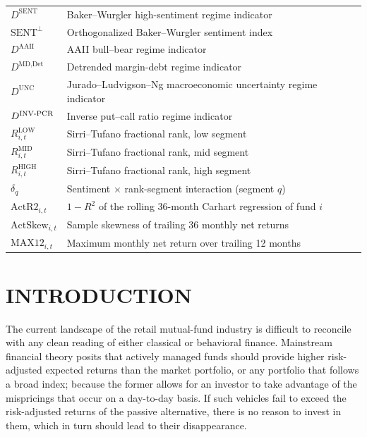 \documentclass[12pt, oneside]{report}
\newif\ifsbeplainlist   %
\begin{document}
\begin{longtable}{@{}ll@{}}
$D^{\text{SENT}}$             & Baker--Wurgler high-sentiment regime indicator \\
$\text{SENT}^{\perp}$         & Orthogonalized Baker--Wurgler sentiment index \\
$D^{\text{AAII}}$             & AAII bull--bear regime indicator \\
$D^{\text{MD,Det}}$           & Detrended margin-debt regime indicator \\
$D^{\text{UNC}}$              & Jurado--Ludvigson--Ng macroeconomic uncertainty regime indicator \\
$D^{\text{INV\text{-}PCR}}$   & Inverse put--call ratio regime indicator \\
$R^{\text{LOW}}_{i,t}$        & Sirri--Tufano fractional rank, low segment \\
$R^{\text{MID}}_{i,t}$        & Sirri--Tufano fractional rank, mid segment \\
$R^{\text{HIGH}}_{i,t}$       & Sirri--Tufano fractional rank, high segment \\
$\delta_q$                      & Sentiment $\times$ rank-segment interaction (segment $q$) \\
$\text{ActR2}_{i,t}$          & $1-R^2$ of the rolling 36-month Carhart regression of fund $i$ \\
$\text{ActSkew}_{i,t}$        & Sample skewness of trailing 36 monthly net returns \\
$\text{MAX12}_{i,t}$          & Maximum monthly net return over trailing 12 months \\
\end{longtable}
\addtocounter{table}{-1}   %
\sbeplainlistfalse

\clearpage
\setcounter{page}{1}

\chapter{INTRODUCTION}
\label{ch:introduction}

\noindent The current landscape of the retail mutual-fund industry is
difficult to reconcile with any clean reading of either classical or
behavioral finance. Mainstream financial theory posits that actively managed funds should provide higher risk-adjusted expected returns than the market portfolio, or any portfolio that follows a broad index; because the former allows for an investor to take advantage of the mispricings that occur on a day-to-day basis. If such vehicles fail to exceed the risk-adjusted returns of the passive alternative, there is no reason to invest in them, which in turn should lead to their disappearance. 
\end{document}
